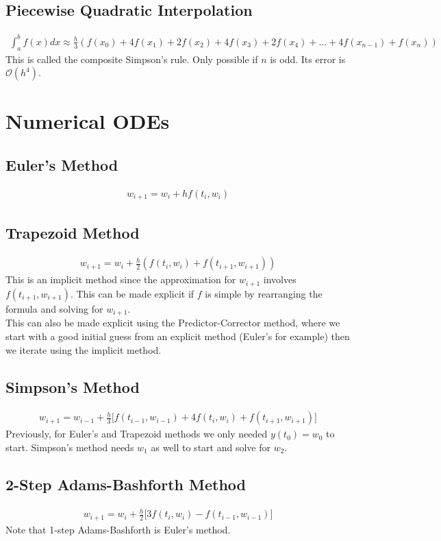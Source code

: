 \documentclass[12pt, letterpaper]{article}
\begin{document}
\subsection{Piecewise Quadratic Interpolation}
\begin{align*}
    \int_{a}^{b}f(x)dx \approx \frac{h}{3}(f(x_0)+4f(x_1)+2f(x_2)+4f(x_3)+2f(x_4)+...+4f(x_{n-1})+f(x_n))
\end{align*}
This is called the composite Simpson's rule. Only possible if $n$ is odd. Its error is $\mathcal{O}(h^4)$.

\newpage
\section{Numerical ODEs}
\subsection{Euler's Method}
\begin{align*}
    w_{i+1} = w_i +hf(t_i,w_i)
\end{align*}
\subsection{Trapezoid Method}
\begin{align*}
    w_{i+1} = w_i + \frac{h}{2} (f(t_i,w_i) + f(t_{i+1},w_{i+1}))
\end{align*}
This is an implicit method since the approximation for $w_{i+1}$ involves $f(t_{i+1},w_{i+1})$. 
This can be made explicit if $f$ is simple by rearranging the formula and solving for $w_{i+1}$. \\

\noindent This can also be made explicit using the Predictor-Corrector method, where we start
with a good initial guess from an explicit method (Euler's for example) then we iterate using the implicit method.

\subsection{Simpson's Method}
\begin{align*}
    w_{i+1} = w_{i-1} + \frac h3 \big[ f(t_{i-1},w_{i-1}) + 4f(t_{i},w_{i}) + f(t_{i+1},w_{i+1})  \big]
\end{align*}
Previously, for Euler's and Trapezoid methods we only needed $y(t_0)=w_0$ to start. Simpson's method
needs $w_1$ as well to start and solve for $w_2$.

\subsection{2-Step Adams-Bashforth Method}
\begin{align*}
    w_{i+1} = w_i + \frac h2 \big[ 3f(t_i,w_i) -f(t_{i-1},w_{i-1}) \big]
\end{align*}
Note that 1-step Adams-Bashforth is Euler's method.
\end{document}

